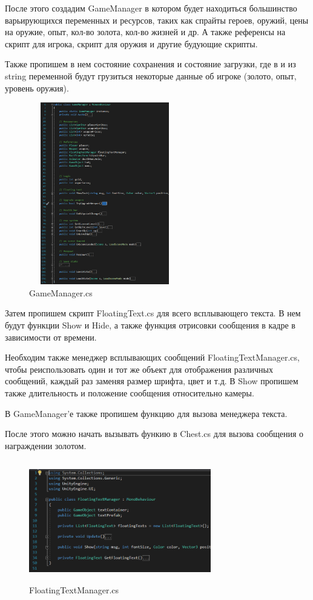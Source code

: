\documentclass[a4paper,12pt]{article}
\begin{document}
После этого создадим GameManager в котором будет находиться большинство варьирующихся переменных и ресурсов, таких как спрайты героев, оружий, цены на оружие, опыт, кол-во золота, кол-во жизней и др. А также референсы на скрипт для игрока, скрипт для оружия и другие будующие скрипты.

Также пропишем в нем состояние сохранения и состояние загрузки, где в и из string переменной будут грузиться некоторые данные об игроке (золото, опыт, уровень оружия).

\begin{figure}[h]
\centering
\includegraphics[width = 250px, height=300px]{pictures/gm.png}
\caption{GameManager.cs}
\end{figure}

Затем пропишем скрипт FloatingText.cs для всего всплывающего текста. В нем будут функции Show и Hide, а также функция отрисовки сообщения в кадре в зависимости от времени. 

Необходим также менеджер всплывающих сообщений FloatingTextManager.cs, чтобы реиспользовать один и тот же объект для отображения различных сообщений, каждый раз заменяя размер шрифта, цвет и т.д. В Show пропишем также длительность и положение сообщения относительно камеры.

В GameManager'е также пропишем функцию для вызова менеджера текста.

После этого можно начать вызывать функию в Chest.cs для вызова сообщения о награждении золотом.

\begin{figure}[h]
\centering
\includegraphics[width = 300px, height=200px]{pictures/fm.png}
\caption{FloatingTextManager.cs}
\end{figure}
\end{document}

